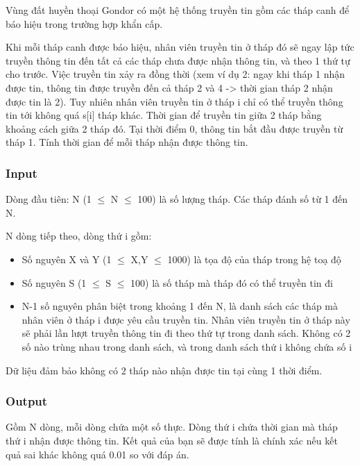 

Vùng đất huyền thoại Gondor có một hệ thống truyền tin gồm các tháp canh để báo hiệu trong trường hợp khẩn cấp.

Khi mỗi tháp canh được báo hiệu, nhân viên truyền tin ở tháp đó sẽ ngay lập tức truyền thông tin đến tất cả các tháp chưa được nhận thông tin, và theo 1 thứ tự cho trước. Việc truyền tin xảy ra đồng thời (xem ví dụ 2: ngay khi tháp 1 nhận được tin, thông tin được truyền đến cả tháp 2 và 4 -> thời gian tháp 2 nhận được tin là 2). Tuy nhiên nhân viên truyền tin ở tháp i chỉ có thể truyền thông tin tới không quá s[i] tháp khác. Thời gian để truyền tin giữa 2 tháp bằng khoảng cách giữa 2 tháp đó. Tại thời điểm 0, thông tin bắt đầu được truyền từ tháp 1. Tính thời gian để mỗi tháp nhận được thông tin.

\subsubsection{Input}

Dòng đầu tiên: N (1  $\le$  N  $\le$  100) là số lượng tháp. Các tháp đánh số từ 1 đến N.

N dòng tiếp theo, dòng thứ i gồm:
\begin{itemize}
	\item Số nguyên X và Y (1 $\le$ X,Y $\le$ 1000) là tọa độ của tháp trong hệ toạ độ
	\item Số nguyên S (1 $\le$ S $\le$ 100) là số tháp mà tháp đó có thể truyền tin đi
	\item N-1 số nguyên phân biệt trong khoảng 1 đến N, là danh sách các tháp mà nhân viên ở tháp i được yêu cầu truyền tin. Nhân viên truyền tin ở tháp này sẽ phải lần lượt truyền thông tin đi theo thứ tự trong danh sách. Không có 2 số nào trùng nhau trong danh sách, và trong danh sách thứ i không chứa số i
\end{itemize}

Dữ liệu đảm bảo không có 2 tháp nào nhận được tin tại cùng 1 thời điểm.

\subsubsection{Output}

Gồm N dòng, mỗi dòng chứa một số thực. Dòng thứ i chứa thời gian mà tháp thứ i nhận được thông tin. Kết quả của bạn sẽ được tính là chính xác nếu kết quả sai khác không quá 0.01 so với đáp án.

